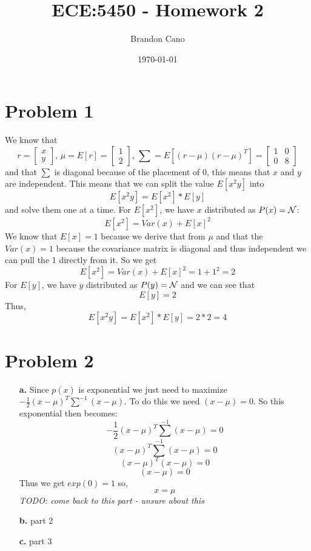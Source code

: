 \documentclass[12pt]{article}
\title{ECE:5450 - Homework 2}
\author{Brandon Cano}
\date{\today}
\begin{document}
\maketitle

\section*{Problem 1}

We know that
\[
r = \begin{bmatrix}
x \\
y
\end{bmatrix},\,
\mu = E[r] = \begin{bmatrix}
1 \\
2
\end{bmatrix},\,
\sum = E\left[(r - \mu)(r - \mu)^{T}\right]= \begin{bmatrix}
1 & 0 \\
0 & 8
\end{bmatrix}
\]
and that $\sum$ is diagonal because of the placement of 0, this means that $x$ and $y$ are independent.
This means that we can split the value $E[x^{2}y]$ into
\[ E[x^{2}y] = E[x^{2}] * E[y] \]
and solve them one at a time.
For $E[x^{2}]$, we have $x$ distributed as $P(x) = \cal{N}$:
\[ 
E[x^{2}] = Var(x) + E[x]^{2}
\]
We know that $E[x] = 1$ because we derive that from $\mu$ and that the $Var(x) = 1$ because the covariance matrix is diagonal and thus independent we can pull the 1 directly from it. 
So we get
\[ 
E[x^{2}] = Var(x) + E[x]^{2} = 1 + 1^{2} = 2
\]
For $E[y]$, we have $y$ distributed as $P(y) = \cal{N}$ and we can see that 
\[
E[y] = 2
\]
Thus,
\[
E[x^{2}y] = E[x^{2}] * E[y] = 2 * 2 = \boxed{4}
\]

\section*{Problem 2}

\begin{enumerate}
    \item[\textbf{a.}] Since $p(x)$ is exponential we just need to maximize $-\frac{1}{2}(x - \mu)^{T}\sum^{-1}(x - \mu)$. 
    To do this we need $(x - \mu) = 0$.
    So this exponential then becomes:
    \[
    -\frac{1}{2}(x - \mu)^{T}\sum^{-1}(x - \mu) = 0
    \]
    \[
    (x - \mu)^{T}\sum^{-1}(x - \mu) = 0
    \]
    \[
    (x - \mu)^{T}(x - \mu) = 0
    \]
    \[
    (x - \mu) = 0
    \]
    Thus we get $exp(0) = 1$ so, 
    \[
    x = \mu
    \]
    \textit{TODO: come back to this part - unsure about this}
    \item[\textbf{b.}] part 2
    
	\item[\textbf{c.}] part 3
	
\end{enumerate}
\end{document}

